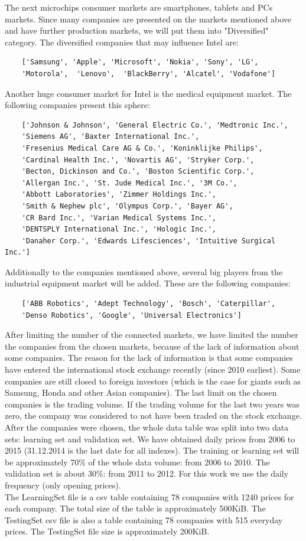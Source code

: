 \documentclass[
  twoside,
  11pt, a4paper,
  footinclude=true,
  headinclude=true,
  cleardoublepage=empty
]{scrreprt}
\begin{document}
    The next microchips consumer markets are smartphones, tablets and PCs markets. Since many companies are presented on the markets mentioned above and have further production markets, we will put them into "Diversified" category. The diversified companies that may influence Intel are:
    \begin{verbatim}
    ['Samsung', 'Apple', 'Microsoft', 'Nokia', 'Sony', 'LG',
    'Motorola',  'Lenovo',  'BlackBerry', 'Alcatel', 'Vodafone']
    \end{verbatim} 
    Another huge consumer market for Intel is the medical equipment market. The following companies present this sphere:
    \begin{verbatim}
    ['Johnson & Johnson', 'General Electric Co.', 'Medtronic Inc.',
    'Siemens AG', 'Baxter International Inc.', 
    'Fresenius Medical Care AG & Co.', 'Koninklijke Philips',
    'Cardinal Health Inc.', 'Novartis AG', 'Stryker Corp.',
    'Becton, Dickinson and Co.', 'Boston Scientific Corp.',
    'Allergan Inc.', 'St. Jude Medical Inc.', '3M Co.',
    'Abbott Laboratories', 'Zimmer Holdings Inc.', 
    'Smith & Nephew plc', 'Olympus Corp.', 'Bayer AG',
    'CR Bard Inc.', 'Varian Medical Systems Inc.',
    'DENTSPLY International Inc.', 'Hologic Inc.', 
    'Danaher Corp.', 'Edwards Lifesciences', 'Intuitive Surgical Inc.']
    \end{verbatim}
    Additionally to the companies mentioned above, several big players from the industrial equipment market will be added. These are the following companies:
    \begin{verbatim} 
    ['ABB Robotics', 'Adept Technology', 'Bosch', 'Caterpillar',
    'Denso Robotics', 'Google', 'Universal Electronics']
    \end{verbatim}
    After limiting the number of the connected markets, we have limited the number the companies from the chosen markets, because of the lack of  information about some companies. The reason for the lack of information is that some companies have entered the international stock exchange recently (since 2010 earliest). Some companies are still closed to foreign investors (which is the case for giants such as Samsung, Honda and other Asian companies). The last limit on the chosen companies is the trading volume. If the trading volume for the last two years was zero, the company was considered to not have been traded on the stock exchange.\\
    After the companies were chosen, the whole data table was split into two data sets: learning set and validation set. We have obtained daily prices from 2006 to 2015 (31.12.2014 is the last date for all indexes). The training or learning set will be approximately 70\% of the whole data volume: from 2006 to 2010. The validation set is about 30\%: from 2011 to 2012. For this work we use the daily frequency (only opening prices).\\
    The LearningSet file is a csv table containing 78 companies with 1240 prices for each company. The total size of the table is approximately 500KiB. The TestingSet csv file is also a table containing 78 companies with 515 everyday prices. The TestingSet file size is approximately 200KiB.\\
    
\end{document}
